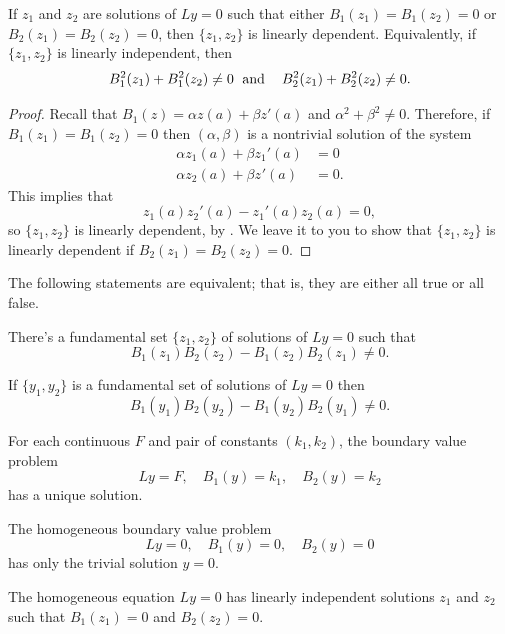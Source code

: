 \begin{theorem}\label{thmtype:13.1.1}
If $z_{1}$ and $z_{2}$ are solutions of $Ly=0$  such that either
$B_{1}(z_{1})=B_{1}(z_{2})=0$ or
$B_{2}(z_{1})=B_{2}(z_{2})=0$,  then $\{z_{1},z_{2}\}$  is linearly
dependent. Equivalently, if\,  $\{z_{1},z_{2}\}$ is linearly
independent, then
\[
B_{1}^{2}(z_{1})+B_{1}^{2}(z_{2})\ne 0 \text{\;    and\; \;  }
B_{2}^{2}(z_{1})+B_{2}^{2}(z_{2})\ne 0.
\]
\end{theorem}

\begin{proof}
Recall that $B_{1}(z)=\alpha z(a)+\beta z'(a)$ and
$\alpha^{2}+\beta^{2}\ne0$.
Therefore, if $B_{1}(z_{1})=B_{1}(z_{2})=0$ then $(\alpha,\beta)$
is a nontrivial solution of  the system
\begin{align*}
\alpha z_{1}(a)+\beta z_{1}'(a)&= 0\\
\alpha z_{2}(a)+\beta z_{}'(a)&= 0.
\end{align*}
This implies that
\[
z_{1}(a)z_{2}'(a)-z_{1}'(a)z_{2}(a)=0,
\]
so $\{z_{1},z_{2}\}$ is linearly dependent, by
. We leave it to you to show
that $\{z_{1},z_{2}\}$ is linearly dependent   if
$B_{2}(z_{1})=B_{2}(z_{2})=0$.
\end{proof}

\begin{theorem}\label{thmtype:13.1.2}
The following statements are equivalent; that is, they are either
all true or all false.
\begin{alist}
\item    %
 There's a fundamental set $\{z_{1},z_{2}\}$ of solutions of
$Ly=0$ such that
\begin{equation} \label{eq:13.1.8}
B_{1}(z_{1})B_{2}(z_{2})-B_{1}(z_{2})B_{2}(z_{1})\ne0.
\end{equation}
\item %
If  $\{y_{1},y_{2}\}$ is a fundamental set of solutions of $Ly=0$  then
\begin{equation} \label{eq:13.1.9}
B_{1}(y_{1})B_{2}(y_{2})-B_{1}(y_{2})B_{2}(y_{1})\ne0.
\end{equation}
\item %
For each continuous $F$ and pair of constants $(k_{1},k_{2})$,  the
boundary value problem
\[
Ly=F, \quad B_{1}(y)=k_{1},\quad B_{2}(y)=k_{2}
\]
has a unique solution.
\item %
The homogeneous boundary value problem
\begin{equation} \label{eq:13.1.10}
Ly=0,\quad  B_{1}(y)=0, \quad B_{2}(y)=0
\end{equation}
has only the trivial solution $y=0$.
\item %
The homogeneous equation $Ly=0$ has linearly independent solutions
$z_{1}$ and $z_{2}$ such that $B_{1}(z_{1})=0$ and $B_{2}(z_{2})=0$.
\end{alist}
\end{theorem}



